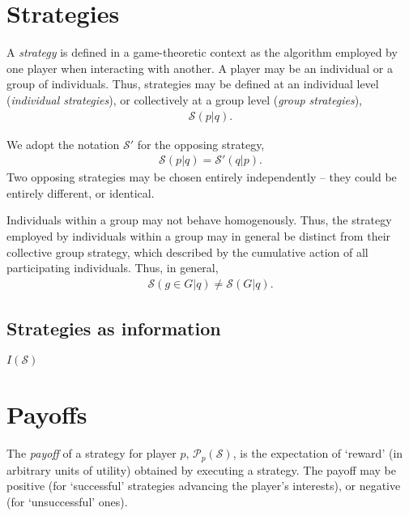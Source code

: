 \documentclass[twocolumn, aps, rmp, amsmath, amssymb, nofootinbib, superscriptaddress, longbibliography, floatfix, table-of-contents, eqsecnum]{revtex4-1}
\begin{document}
\section{Strategies}

A \textit{strategy} is defined in a game-theoretic context as the algorithm employed by one player when interacting with another. A player may be an individual or a group of individuals. Thus, strategies may be defined at an individual level (\textit{individual strategies}), or collectively at a group level (\textit{group strategies}),
\begin{align}
	\mathcal{S}(p|q).	
\end{align}


We adopt the notation $\mathcal{S}'$ for the opposing strategy,
\begin{align}
	\mathcal{S}(p|q) = \mathcal{S}'(q|p).
\end{align}
Two opposing strategies may be chosen entirely independently -- they could be entirely different, or identical.

Individuals within a group may not behave homogenously. Thus, the strategy employed by individuals within a group may in general be distinct from their collective group strategy, which described by the cumulative action of all participating individuals. Thus, in general,
\begin{align}
	\mathcal{S}(g\in G|q)\neq \mathcal{S}(G|q).
\end{align}

\subsection{Strategies as information}

$I(\mathcal{S})$

\section{Payoffs}

The \textit{payoff} of a strategy for player $p$, $\mathcal{P}_p(\mathcal{S})$, is the expectation of `reward' (in arbitrary units of utility) obtained by executing a strategy. The payoff may be positive (for `successful' strategies advancing the player's interests), or negative (for `unsuccessful' ones).
\end{document}
